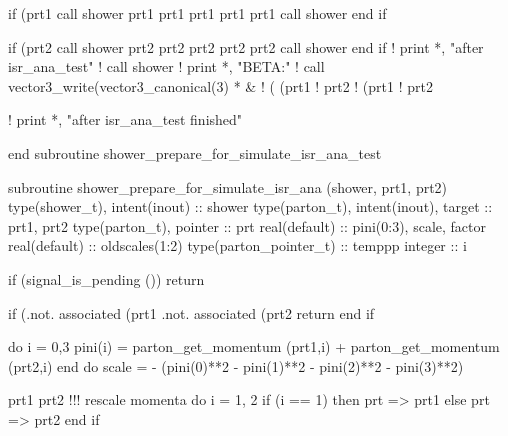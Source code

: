    if (prt1%
       call shower%
       prt1%
       prt1%
       prt1%
       prt1%
       prt1%
       call shower%
    end if

    if (prt2%
       call shower%
       prt2%
       prt2%
       prt2%
       prt2%
       prt2%
       call shower%
    end if
    ! print *, "after isr_ana_test"
    ! call shower%
    ! print *, "BETA:"
    ! call vector3_write(vector3_canonical(3) * &
    !      ( (prt1%
    !      prt2%
    !        (prt1%
    !        prt2%

    ! print *, "after isr_ana_test finished"

  end subroutine shower_prepare_for_simulate_isr_ana_test

\eatline
\nwendcode{}\nwdocspar
\nwenddocs{}\plusendmoddef
  subroutine shower_prepare_for_simulate_isr_ana (shower, prt1, prt2)
    type(shower_t), intent(inout) :: shower
    type(parton_t), intent(inout), target :: prt1, prt2
    type(parton_t), pointer :: prt
    real(default) ::  pini(0:3), scale, factor
    real(default) :: oldscales(1:2)
    type(parton_pointer_t) :: temppp
    integer :: i

    if (signal_is_pending ()) return

    if (.not. associated (prt1%
        .not. associated (prt2%
       return
    end if

    do i = 0,3
       pini(i) = parton_get_momentum (prt1,i) + parton_get_momentum (prt2,i)
    end do
    scale = - (pini(0)**2 - pini(1)**2 - pini(2)**2 - pini(3)**2)

    prt1%
    prt2%
    !!! rescale momenta
    do i = 1, 2
       if (i == 1) then
          prt => prt1
       else
          prt => prt2
       end if

